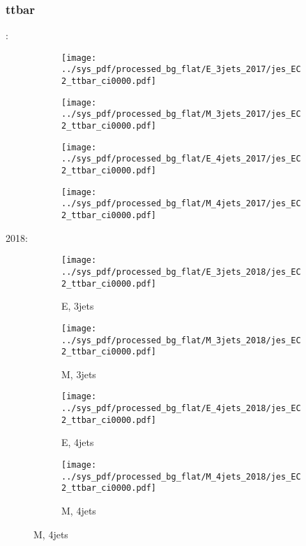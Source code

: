 \documentclass{beamer}
\begin{document}
\begin{frame}
\frametitle{ttbar}
\fontsize{5}{1}:
\begin{figure}
\centering
\begin{subfigure}[b]{0.24\textwidth}
\texttt{[image: ../sys\_pdf/processed\_bg\_flat/E\_3jets\_2017/jes\_EC2\_ttbar\_ci0000.pdf]}
\end{subfigure}
\begin{subfigure}[b]{0.24\textwidth}
\texttt{[image: ../sys\_pdf/processed\_bg\_flat/M\_3jets\_2017/jes\_EC2\_ttbar\_ci0000.pdf]}
\end{subfigure}
\begin{subfigure}[b]{0.24\textwidth}
\texttt{[image: ../sys\_pdf/processed\_bg\_flat/E\_4jets\_2017/jes\_EC2\_ttbar\_ci0000.pdf]}
\end{subfigure}
\begin{subfigure}[b]{0.24\textwidth}
\texttt{[image: ../sys\_pdf/processed\_bg\_flat/M\_4jets\_2017/jes\_EC2\_ttbar\_ci0000.pdf]}
\end{subfigure}
\end{figure}
2018:
\begin{figure}
\centering
\begin{subfigure}[b]{0.24\textwidth}
\texttt{[image: ../sys\_pdf/processed\_bg\_flat/E\_3jets\_2018/jes\_EC2\_ttbar\_ci0000.pdf]}
\captionsetup{font=tiny}
\caption{E, 3jets}
\end{subfigure}
\begin{subfigure}[b]{0.24\textwidth}
\texttt{[image: ../sys\_pdf/processed\_bg\_flat/M\_3jets\_2018/jes\_EC2\_ttbar\_ci0000.pdf]}
\captionsetup{font=tiny}
\caption{M, 3jets}
\end{subfigure}
\begin{subfigure}[b]{0.24\textwidth}
\texttt{[image: ../sys\_pdf/processed\_bg\_flat/E\_4jets\_2018/jes\_EC2\_ttbar\_ci0000.pdf]}
\captionsetup{font=tiny}
\caption{E, 4jets}
\end{subfigure}
\begin{subfigure}[b]{0.24\textwidth}
\texttt{[image: ../sys\_pdf/processed\_bg\_flat/M\_4jets\_2018/jes\_EC2\_ttbar\_ci0000.pdf]}
\captionsetup{font=tiny}
\caption{M, 4jets}
\end{subfigure}
\end{figure}
\end{frame}
\end{document}
